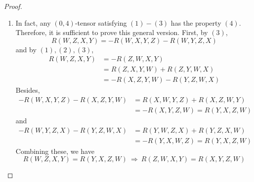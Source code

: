 \begin{enumerate}[label=\arabic{*}.]
\begin{proof}
\begin{enumerate}[label=(\arabic{*})]
			\item In fact, any $(0,4)$-tensor satisfying $(1)-(3)$ has the property $(4)$. Therefore, it is sufficient to prove this general version. First, by $(3)$,
			\begin{equation*}
				R(W,Z,X,Y) = -R(W,X,Y,Z)-R(W,Y,Z,X)
			\end{equation*}
			and by $(1),(2),(3)$,
			\begin{equation*}
				\begin{aligned}
					R(W,Z,X,Y) &= -R(Z,W,X,Y) \\
					&=R(Z,X,Y,W) + R(Z,Y,W,X) \\
					&= -R(X,Z,Y,W) - R(Y,Z,W,X)
				\end{aligned}
			\end{equation*}
			Besides, 
			\begin{equation*}
				\begin{aligned}
					-R(W,X,Y,Z)-R(X,Z,Y,W) & =  R(X,W,Y,Z) + R(X,Z,W,Y) \\
					&= - R(X,Y,Z,W) = R(Y,X,Z,W)
				\end{aligned}
			\end{equation*}
			and
			\begin{equation*}
				\begin{aligned}
					-R(W,Y,Z,X)-R(Y,Z,W,X) &= R(Y,W,Z,X)+R(Y,Z,X,W) \\
					&= -R(Y,X,W,Z) = R(Y,X,Z,W)
				\end{aligned}
			\end{equation*}
			Combining these, we have
			\begin{equation*}
				R(W,Z,X,Y) = R(Y,X,Z,W)~\Rightarrow~R(Z,W,X,Y) = R(X,Y,Z,W)
			\end{equation*}


\end{enumerate}
\end{proof}
\end{enumerate}
